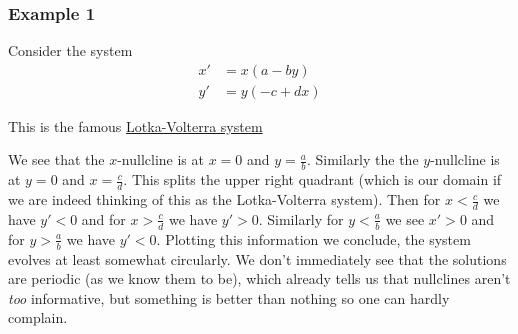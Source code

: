 \subsubsection{Example 1}
Consider the system
\begin{align*}
    x' &= x(a - by)\\
    y' &= y(-c + dx)
\end{align*}
\begin{remark}
This is the famous \href{https://en.wikipedia.org/wiki/Lotka\%E2\%80\%93Volterra_equations}{Lotka-Volterra system}
\end{remark}
We see that the $x$-nullcline is at $x = 0$ and $y = \frac{a}{b}$. Similarly the the $y$-nullcline is at $y = 0$ and $x = \frac{c}{d}$. This splits the upper right quadrant (which is our domain if we are indeed thinking of this as the Lotka-Volterra system). Then for $x < \frac{c}{d}$ we have $y' < 0$ and for $x > \frac{c}{d}$ we have $y' > 0$. Similarly for $y < \frac{a}{b}$ we see $x' >0$ and for $y > \frac{a}{b}$ we have $y' < 0$. Plotting this information we conclude, the system evolves at least somewhat circularly. We don't immediately see that the solutions are periodic (as we know them to be), which already tells us that nullclines aren't \textit{too} informative, but something is better than nothing so one can hardly complain.

